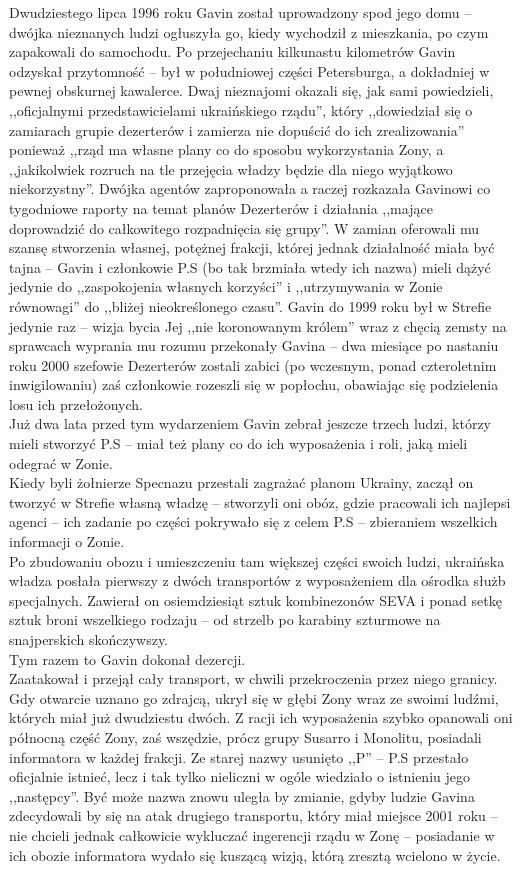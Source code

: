 \documentclass[../MAIN.tex]{subfiles}
\begin{document}
Dwudziestego lipca 1996 roku Gavin został uprowadzony spod jego domu -- dwójka nieznanych ludzi ogłuszyła go, kiedy wychodził z mieszkania, po czym zapakowali do samochodu. Po przejechaniu kilkunastu kilometrów Gavin odzyskał przytomność -- był w południowej części Petersburga, a dokładniej w pewnej obskurnej kawalerce. Dwaj nieznajomi okazali się, jak sami powiedzieli, ,,oficjalnymi przedstawicielami ukraińskiego rządu'', który ,,dowiedział się o zamiarach grupie dezerterów i zamierza nie dopuścić do ich zrealizowania'' ponieważ ,,rząd ma własne plany co do sposobu wykorzystania Zony, a ,,jakikolwiek rozruch na tle przejęcia władzy będzie dla niego wyjątkowo niekorzystny''. Dwójka agentów zaproponowała a raczej rozkazała Gavinowi co tygodniowe raporty na temat planów Dezerterów i działania ,,mające doprowadzić do całkowitego rozpadnięcia się grupy''. W zamian oferowali mu szansę stworzenia własnej, potężnej frakcji, której jednak działalność miała być tajna -- Gavin i członkowie P.S (bo tak brzmiała wtedy
ich nazwa) mieli dążyć jedynie do ,,zaspokojenia własnych korzyści'' i ,,utrzymywania w Zonie równowagi'' do ,,bliżej nieokreślonego czasu''. Gavin do 1999 roku był w Strefie jedynie raz -- wizja bycia Jej ,,nie koronowanym królem'' wraz z chęcią zemsty na sprawcach wyprania mu rozumu przekonały Gavina -- dwa miesiące po nastaniu roku 2000 szefowie Dezerterów zostali zabici (po wczesnym, ponad czteroletnim inwigilowaniu) zaś członkowie rozeszli się w popłochu, obawiając się podzielenia losu ich przełożonych.
\\
Już dwa lata przed tym wydarzeniem Gavin zebrał jeszcze trzech ludzi, którzy mieli stworzyć P.S -- miał też plany co do ich wyposażenia i roli, jaką mieli odegrać w Zonie.\\
Kiedy byli żołnierze Specnazu przestali zagrażać planom Ukrainy, zaczął on tworzyć w Strefie własną władzę -- stworzyli oni obóz, gdzie pracowali ich najlepsi agenci -- ich zadanie po części pokrywało się z celem P.S -- zbieraniem wszelkich informacji o Zonie.\\
Po zbudowaniu obozu i umieszczeniu tam większej części swoich ludzi, ukraińska władza posłała pierwszy z dwóch transportów z wyposażeniem dla ośrodka służb specjalnych. Zawierał on osiemdziesiąt sztuk kombinezonów SEVA i ponad setkę sztuk broni wszelkiego rodzaju -- od strzelb po karabiny szturmowe na snajperskich skończywszy.\\
Tym razem to Gavin dokonał dezercji.\\
Zaatakował i przejął cały transport, w chwili przekroczenia przez niego granicy. Gdy otwarcie uznano go zdrajcą, ukrył się w głębi Zony wraz ze swoimi ludźmi, których miał już dwudziestu dwóch. Z racji ich wyposażenia szybko opanowali oni północną część Zony, zaś wszędzie, prócz grupy Susarro i Monolitu, posiadali informatora w każdej frakcji. Ze starej nazwy usunięto ,,P'' -- P.S przestało oficjalnie istnieć, lecz i tak tylko nieliczni w ogóle wiedziało o istnieniu jego ,,następcy''. Być może nazwa znowu uległa by zmianie, gdyby ludzie Gavina zdecydowali by się na atak drugiego transportu, który miał miejsce 2001 roku -- nie chcieli jednak całkowicie wykluczać ingerencji rządu w Zonę -- posiadanie w ich obozie informatora wydało się kuszącą wizją, którą zresztą wcielono w życie.\\
\end{document}
